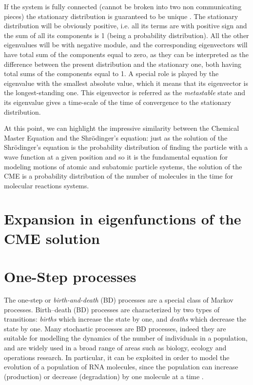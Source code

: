\documentclass[12pt,a4paper]{report}
\begin{document}
If the system is fully connected (cannot be broken into two non communicating pieces) the stationary distribution is guaranteed to be unique \cite{PHD}. The stationary distribution will be obviously positive, i.e. all its terms are with positive sign and the sum of all its components is 1 (being a probability distribution). All the other eigenvalues will be with negative module, and the corresponding eigenvectors will have total sum of the components equal to zero, as they can be interpreted as the difference between the present distribution and the stationary one, both having total sums of the components equal to 1. A special role is played by the eigenvalue with the smallest absolute value, which it means that its eigenvector is the longest-standing one. This eigenvector is referred as the \emph{metastable} state and its eigenvalue gives a time-scale of the time of convergence to the stationary distribution.


At this point, we can highlight the impressive similarity between the Chemical Master Equation and the Shr\"{o}dinger's equation: just as the solution of the Shr\"{o}dinger's equation is the probability distribution of finding the particle with a wave function at a given position and so it is the fundamental equation for modeling motions of atomic and subatomic particle systems, the solution of the CME is a probability distribution of the number of molecules in the time for molecular reactions systems.
     

\section{Expansion in eigenfunctions of the CME solution}

\section{One-Step processes}\label{theonestepdiscussion}
The one-step or \emph{birth-and-death} (BD) processes are a special class of Markov processes.
Birth–death (BD) processes are characterized by two types of transitions: \emph{births} which increase the state by one, and \emph{deaths} which decrease the state by one. Many stochastic processes are BD processes, indeed they are suitable for modelling the dynamics of the number of individuals in a population, and are widely used in a broad range of areas such as biology, ecology and operations research. In particular, it can be exploited in order to model the evolution of a population of RNA molecules, since the population can increase (production) or decrease (degradation) by one molecule at a time \cite{onesteparticle}. 
\end{document}
